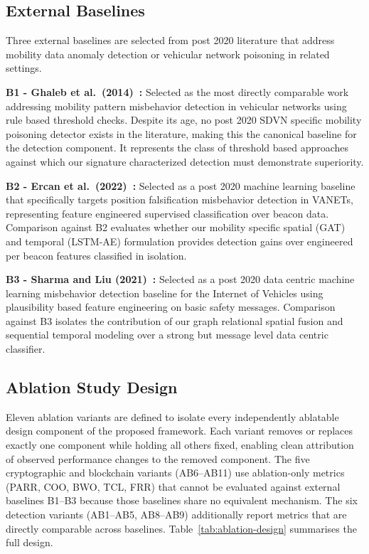 \documentclass[12pt, a4paper]{report}
\begin{document}
\subsection{External Baselines}

Three external baselines are selected from post 2020 literature that
address mobility data anomaly detection or vehicular network poisoning
in related settings.

\textbf{B1 - Ghaleb et al.\ (2014)~\cite{ghaleb2014}:}
Selected as the most directly comparable work addressing mobility
pattern misbehavior detection in vehicular networks using rule based
threshold checks. Despite its age, no post 2020 SDVN specific mobility
poisoning detector exists in the literature, making this the canonical
baseline for the detection component. It represents the class of
threshold based approaches against which our signature characterized
detection must demonstrate superiority.

\textbf{B2 - Ercan et al.\ (2022)~\cite{ercan2022misbehavior}:}
Selected as a post 2020 machine learning baseline that specifically
targets position falsification misbehavior detection in VANETs,
representing feature engineered supervised classification over beacon
data. Comparison against B2 evaluates whether our mobility specific
spatial (GAT) and temporal (LSTM-AE) formulation provides detection
gains over engineered per beacon features classified in isolation.

\textbf{B3 - Sharma and Liu (2021)~\cite{sharma2021machine}:}
Selected as a post 2020 data centric machine learning misbehavior
detection baseline for the Internet of Vehicles using plausibility based
feature engineering on basic safety messages. Comparison against B3
isolates the contribution of our graph relational spatial fusion and
sequential temporal modeling over a strong but message level
data centric classifier.


\subsection{Ablation Study Design}
\label{sec:ablation}

Eleven ablation variants are defined to isolate every independently
ablatable design component of the proposed framework. Each variant
removes or replaces exactly one component while holding all others
fixed, enabling clean attribution of observed performance changes
to the removed component. The five cryptographic and blockchain
variants (AB6--AB11) use ablation-only metrics (PARR, COO, BWO,
TCL, FRR) that cannot be evaluated against external baselines
B1--B3 because those baselines share no equivalent mechanism.
The six detection variants (AB1--AB5, AB8--AB9) additionally
report metrics that are directly comparable across baselines.
Table~\ref{tab:ablation-design} summarises the full design.
\end{document}
